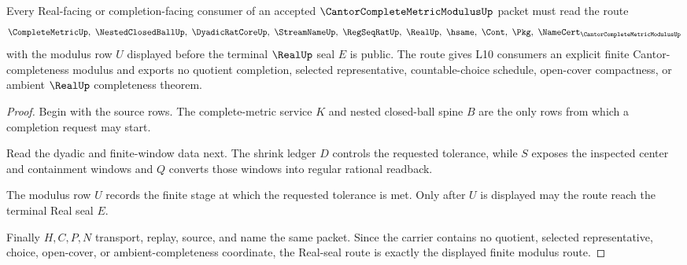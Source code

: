 \begin{theorem}
\label{thm:cantor-complete-metric-modulus-real-seal-route}
Every Real-facing or completion-facing consumer of an accepted $\CantorCompleteMetricModulusUp$ packet must read the route
$$
\CompleteMetricUp,\ \NestedClosedBallUp,\ \DyadicRatCoreUp,\ \StreamNameUp,\ \RegSeqRatUp,\ \RealUp,\ \hsame,\ \Cont,\ \Pkg,\ \NameCert_{\CantorCompleteMetricModulusUp}
$$
with the modulus row $U$ displayed before the terminal $\RealUp$ seal $E$ is public. The route gives L10 consumers an explicit finite Cantor-completeness modulus and exports no quotient completion, selected representative, countable-choice schedule, open-cover compactness, or ambient $\RealUp$ completeness theorem.
\end{theorem}
\begin{proof}
Begin with the source rows. The complete-metric service $K$ and nested closed-ball spine $B$ are the only rows from which a completion request may start.

Read the dyadic and finite-window data next. The shrink ledger $D$ controls the requested tolerance, while $S$ exposes the inspected center and containment windows and $Q$ converts those windows into regular rational readback.

The modulus row $U$ records the finite stage at which the requested tolerance is met. Only after $U$ is displayed may the route reach the terminal Real seal $E$.

Finally $H,C,P,N$ transport, replay, source, and name the same packet. Since the carrier contains no quotient, selected representative, choice, open-cover, or ambient-completeness coordinate, the Real-seal route is exactly the displayed finite modulus route.
\end{proof}



